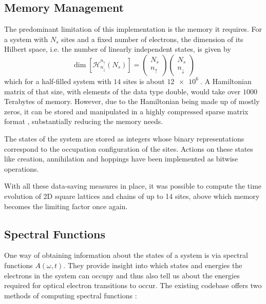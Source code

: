 \subsection{Memory Management}
The predominant limitation of this implementation is the memory it requires. For a system with $N_s$ sites and a fixed number of electrons, the dimension of its Hilbert space, i.e. the number of linearly independent states, is given by 
\begin{equation}
    \dim \left[\mathcal{H}^{n_\uparrow}_{n_\downarrow} (N_s)\right] = \begin{pmatrix}N_s \\ n_\uparrow\end{pmatrix} \begin{pmatrix}N_s \\ n_\downarrow\end{pmatrix}
\end{equation}
which for a half-filled system with $14$ sites is about $\SI{12e6}{}$. A Hamiltonian matrix of that size, with elements of the data type double, would take over $1000$ Terabytes of memory. However, due to the Hamiltonian being made up of mostly zeros, it can be stored and manipulated in a highly compressed sparse matrix format \cite{innerberger}, substantially reducing the memory needs.
\medskip

The states of the system are stored as integers whose binary representations correspond to the occupation configuration of the sites. Actions on these states like creation, annihilation and hoppings have been implemented as bitwise operations.
\medskip
 
With all these data-saving measures in place, it was possible to compute the time evolution of 2D square lattices and chains of up to 14 sites, above which memory becomes the limiting factor once again.


\subsection{Spectral Functions}\label{sec:spectral_functions}

One way of obtaining information about the states of a system is via spectral functions $A(\omega, t)$. They provide insight into which states and energies the electrons in the system can occupy and thus also tell us about the energies required for optical electron transitions to occur. The existing codebase offers two methods of computing spectral functions \cite{spectral_function}:

